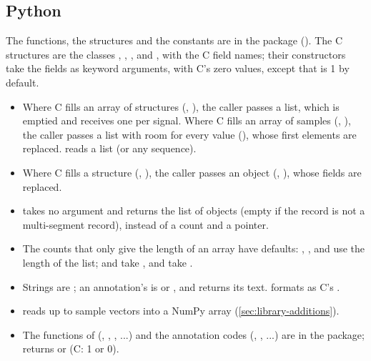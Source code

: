 \subsection{Python}
\label{sec:library-python}

The functions, the structures and the constants are in the package
 (). The C structures are the classes
, , ,  and
, with the C field names; their constructors take the fields
as keyword arguments, with C's zero values, except that  is
1 by default.

\begin{itemize}
\item Where C fills an array of structures (,
  ), the caller passes a list, which is emptied and receives
  one  per signal. Where C fills an array of samples
  (, ), the caller passes a list with room for
  every value (), whose first elements are replaced.
   reads a list (or any sequence).
\item Where C fills a structure (, ), the caller
  passes an object (, ), whose fields are
  replaced.
\item {} takes no argument and returns the list of
   objects (empty if the record is not a multi-segment
  record), instead of a count and a pointer.
\item The counts that only give the length of an array have defaults:
  , ,
   and 
  use the length of the list;  and  take
  ,  and  take
  .
\item Strings are ; an annotation's  is  or
  , and  returns its text.
   formats as C's .
\item {} reads up to  sample vectors into a NumPy
  array (\cref{sec:library-additions}).
\item The functions of  (, ,
  , ...) and the annotation codes (, , ...)
  are in the package;  returns  or 
  (C: 1 or 0).
\end{itemize}

